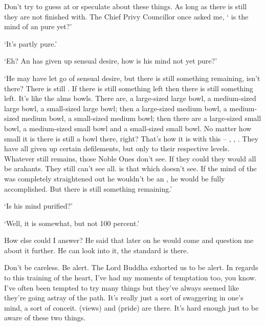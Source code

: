 Don't try to guess at or speculate about these things. As long as there is still  they are not finished with. The Chief Privy Councillor once asked me, ` is the mind of an  pure yet?'

`It's partly pure.'

`Eh? An  has given up sensual desire, how is his mind not yet pure?'

`He may have let go of sensual desire, but there is still something remaining, isn't there? There is still . If there is still something left then there is still something left. It's like the  alms bowls. There are, a large-sized large bowl, a medium-sized large bowl, a small-sized large bowl; then a large-sized medium bowl, a medium-sized medium bowl, a small-sized medium bowl; then there are a large-sized small bowl, a medium-sized small bowl and a small-sized small bowl. No matter how small it is there is still a bowl there, right? That's how it is with this -- , , . They have all given up certain defilements, but only to their respective levels. Whatever still remains, those Noble Ones don't see. If they could they would all be arahants. They still can't see all.  is that which doesn't see. If the mind of the  was completely straightened out he wouldn't be an , he would be fully accomplished. But there is still something remaining.'

`Is his mind purified?'

`Well, it is somewhat, but not 100 percent.'

How else could I answer? He said that later on he would come and question me about it further. He can look into it, the standard is there.

Don't be careless. Be alert. The Lord Buddha exhorted us to be alert. In regards to this training of the heart, I've had my moments of temptation too, you know. I've often been tempted to try many things but they've always seemed like they're going astray of the path. It's really just a sort of swaggering in one's mind, a sort of conceit.  (views) and  (pride) are there. It's hard enough just to be aware of these two things.

